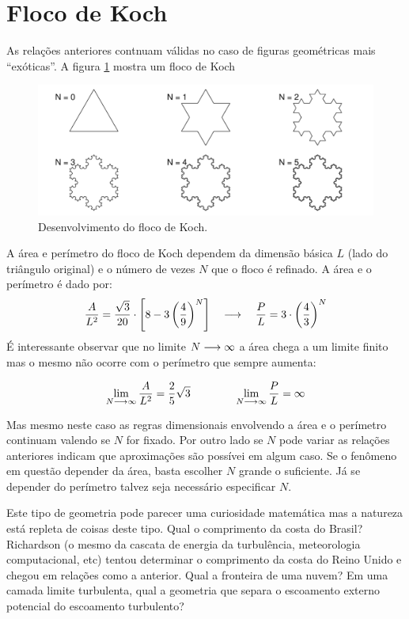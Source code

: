 \section{Floco de Koch}

As relações anteriores contnuam válidas no caso de figuras geométricas mais ``exóticas''. A figura \ref{fig:koch} mostra um floco de Koch

\begin{figure}
\centering
\includegraphics[width=\textwidth]{./figuras/koch.pdf}
\caption{Desenvolvimento do floco de Koch.}
\label{fig:koch}
\end{figure}

A área e perímetro do floco de Koch dependem da dimensão básica $L$ (lado do triângulo original) e o número de vezes $N$ que o floco é refinado. A área e o perímetro é dado por:
\[
\frac{A}{L^2} = \frac{\sqrt{3}}{20} \cdot \left[8 - 3\left(\frac{4}{9}\right)^N\right] \quad\longrightarrow\quad \frac{P}{L} = 3\cdot\left(\frac{4}{3}\right)^N
\]
É interessante observar que no limite $N\longrightarrow\infty$ a área chega a um limite finito mas o mesmo não ocorre com o perímetro que sempre aumenta:

\[
\lim_{N\longrightarrow\infty} \frac{A}{L^2} = \frac{2}{5}\sqrt{3} \qquad\qquad \lim_{N\longrightarrow\infty}\frac{P}{L} = \infty
\]

Mas mesmo neste caso as regras dimensionais envolvendo a área e o perímetro continuam valendo se $N$ for fixado. Por outro lado se $N$ pode variar as relações anteriores indicam que aproximações são possívei em algum caso. Se o fenômeno em questão depender da área, basta escolher $N$ grande o suficiente. Já se depender do perímetro talvez seja necessário especificar $N$.

Este tipo de geometria pode parecer uma curiosidade matemática mas a natureza está repleta de coisas deste tipo. Qual o comprimento da costa do Brasil? Richardson (o mesmo da cascata de energia da turbulência, meteorologia computacional, etc) tentou determinar o comprimento da costa do Reino Unido e chegou em relações como a anterior. Qual a fronteira de uma nuvem? Em uma camada limite turbulenta, qual a geometria que separa o escoamento externo potencial do escoamento turbulento?

